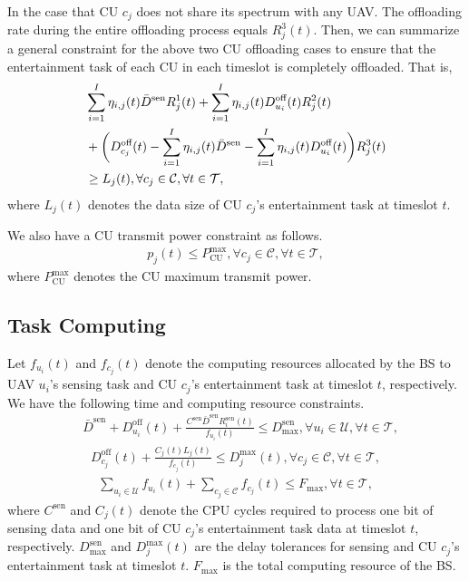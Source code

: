 \documentclass[10pt,journal,compsoc]{IEEEtran}
\begin{document}
In the case that CU $c_{j}$ does not share its spectrum with any UAV. The offloading rate during the entire offloading process equals $R_{j}^{3}(t)$. Then, we can summarize a general constraint for the above two CU offloading cases to ensure that the entertainment task of each CU in each timeslot is completely offloaded. That is,
\begin{align} \label{P0:CUs-task-successful-offloading}
    & \sum_{i = 1}^{I} \eta_{i, j}(t)\bar{D}^{\text{sen}} R_{j}^{1}(t)  
     + \sum_{i = 1}^{I} \eta_{i, j}(t)D_{u_{i}}^{\text{off}}(t) R_{j}^{2}(t) \notag \\
    & + \bigg(D_{c_{j}}^{\text{off}}(t) - \sum_{i = 1}^{I} \eta_{i, j}(t) \bar{D}^{\text{sen}} -\sum_{i = 1}^{I} \eta_{i, j}(t) D_{u_{i}}^{\text{off}}(t)\bigg) R_{j}^{3}(t) \notag \\ 
    &\ge L_{j}(t), \forall c_{j} \in \mathcal{C}, \forall t \in \mathcal{T},
\end{align}
where $L_{j}(t)$ denotes the data size of CU $c_{j}$'s entertainment task at timeslot $t$. 

We also have a CU transmit power constraint as follows. 
\begin{align}\label{P0:CU-Max-Power}
    p_{j}(t) \le P^{\max}_{\text{CU}}, \forall c_{j} \in \mathcal{C}, \forall t \in \mathcal{T},
\end{align}
where $P^{\max}_{\text{CU}}$ denotes the CU maximum transmit power.


\subsection{Task Computing} 
Let $f_{u_{i}}(t)$ and $f_{c_{j}}(t)$ denote the computing resources allocated by the BS to UAV $u_{i}$'s sensing task and CU $c_{j}$'s entertainment task at timeslot $t$, respectively. 
We have the following time and computing resource constraints.
\begin{align}\label{P0:UAV-task-delay}
    &\bar{D}^{\text{sen}} + D_{u_{i}}^{\text{off}}(t) + \frac{C^{\text{sen}}\bar{D}^{\text{sen}}R_{i}^{\text{sen}}(t)}{f_{u_{i}}(t)}  \le D^{\text{sen}}_{\max},  \forall u_{i} \in \mathcal{U}, \forall t \in \mathcal{T},
\end{align}
\begin{align}\label{P0:CU-task-delay}
    D_{c_{j}}^{\text{off}}(t) + \frac{C_{{j}}(t)L_{j}(t)}{f_{c_{j}}(t)} \le D^{\max}_{{j}}(t), \forall c_{j} \in \mathcal{C}, \forall t \in \mathcal{T},
\end{align}
\begin{align}\label{P0:BS-Max-Frequency}
    \sum_{u_{i} \in \mathcal{U}}f_{u_{i}}(t) + \sum_{c_{j} \in \mathcal{C}}f_{c_{j}}(t) \le F_{\max}, \forall t \in \mathcal{T},
\end{align}
where $C^{\text{sen}}$ and $C_{{j}}(t)$ denote the CPU cycles required to process one bit of sensing data and one bit of CU $c_{j}$'s entertainment task data at timeslot $t$, respectively. $D^{\text{sen}}_{\max}$ and $D^{\max}_{{j}}(t)$ are the delay tolerances for sensing and CU $c_{j}$'s entertainment task at timeslot $t$. $F_{\max}$ is the total computing resource of the BS.
\end{document}
